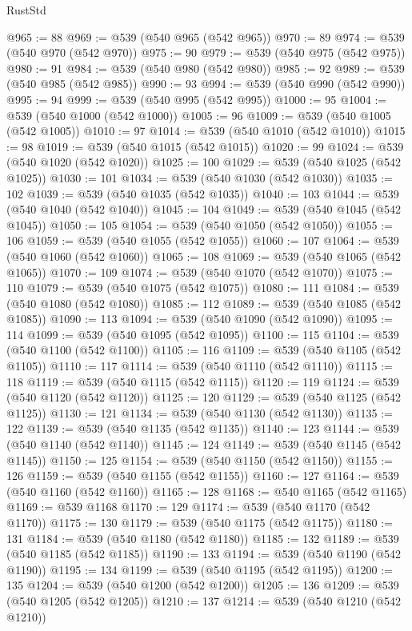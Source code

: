 \begin{lexlean}{RustStd}
\begin{coremodule}
{\begin{coremodule}
{{{{{{{{{{{{{{{{{{{{{{{{{{@965 := 88
@969 := @539 (@540 @965 (@542 @965))
@970 := 89
@974 := @539 (@540 @970 (@542 @970))
@975 := 90
@979 := @539 (@540 @975 (@542 @975))
@980 := 91
@984 := @539 (@540 @980 (@542 @980))
@985 := 92
@989 := @539 (@540 @985 (@542 @985))
@990 := 93
@994 := @539 (@540 @990 (@542 @990))
@995 := 94
@999 := @539 (@540 @995 (@542 @995))
@1000 := 95
@1004 := @539 (@540 @1000 (@542 @1000))
@1005 := 96
@1009 := @539 (@540 @1005 (@542 @1005))
@1010 := 97
@1014 := @539 (@540 @1010 (@542 @1010))
@1015 := 98
@1019 := @539 (@540 @1015 (@542 @1015))
@1020 := 99
@1024 := @539 (@540 @1020 (@542 @1020))
@1025 := 100
@1029 := @539 (@540 @1025 (@542 @1025))
@1030 := 101
@1034 := @539 (@540 @1030 (@542 @1030))
@1035 := 102
@1039 := @539 (@540 @1035 (@542 @1035))
@1040 := 103
@1044 := @539 (@540 @1040 (@542 @1040))
@1045 := 104
@1049 := @539 (@540 @1045 (@542 @1045))
@1050 := 105
@1054 := @539 (@540 @1050 (@542 @1050))
@1055 := 106
@1059 := @539 (@540 @1055 (@542 @1055))
@1060 := 107
@1064 := @539 (@540 @1060 (@542 @1060))
@1065 := 108
@1069 := @539 (@540 @1065 (@542 @1065))
@1070 := 109
@1074 := @539 (@540 @1070 (@542 @1070))
@1075 := 110
@1079 := @539 (@540 @1075 (@542 @1075))
@1080 := 111
@1084 := @539 (@540 @1080 (@542 @1080))
@1085 := 112
@1089 := @539 (@540 @1085 (@542 @1085))
@1090 := 113
@1094 := @539 (@540 @1090 (@542 @1090))
@1095 := 114
@1099 := @539 (@540 @1095 (@542 @1095))
@1100 := 115
@1104 := @539 (@540 @1100 (@542 @1100))
@1105 := 116
@1109 := @539 (@540 @1105 (@542 @1105))
@1110 := 117
@1114 := @539 (@540 @1110 (@542 @1110))
@1115 := 118
@1119 := @539 (@540 @1115 (@542 @1115))
@1120 := 119
@1124 := @539 (@540 @1120 (@542 @1120))
@1125 := 120
@1129 := @539 (@540 @1125 (@542 @1125))
@1130 := 121
@1134 := @539 (@540 @1130 (@542 @1130))
@1135 := 122
@1139 := @539 (@540 @1135 (@542 @1135))
@1140 := 123
@1144 := @539 (@540 @1140 (@542 @1140))
@1145 := 124
@1149 := @539 (@540 @1145 (@542 @1145))
@1150 := 125
@1154 := @539 (@540 @1150 (@542 @1150))
@1155 := 126
@1159 := @539 (@540 @1155 (@542 @1155))
@1160 := 127
@1164 := @539 (@540 @1160 (@542 @1160))
@1165 := 128
@1168 := @540 @1165 (@542 @1165)
@1169 := @539 @1168
@1170 := 129
@1174 := @539 (@540 @1170 (@542 @1170))
@1175 := 130
@1179 := @539 (@540 @1175 (@542 @1175))
@1180 := 131
@1184 := @539 (@540 @1180 (@542 @1180))
@1185 := 132
@1189 := @539 (@540 @1185 (@542 @1185))
@1190 := 133
@1194 := @539 (@540 @1190 (@542 @1190))
@1195 := 134
@1199 := @539 (@540 @1195 (@542 @1195))
@1200 := 135
@1204 := @539 (@540 @1200 (@542 @1200))
@1205 := 136
@1209 := @539 (@540 @1205 (@542 @1205))
@1210 := 137
@1214 := @539 (@540 @1210 (@542 @1210))
}}}}}}}}}}}}}}}}}}}}}}}}}}
\end{coremodule}}
\end{coremodule}
\end{lexlean}

